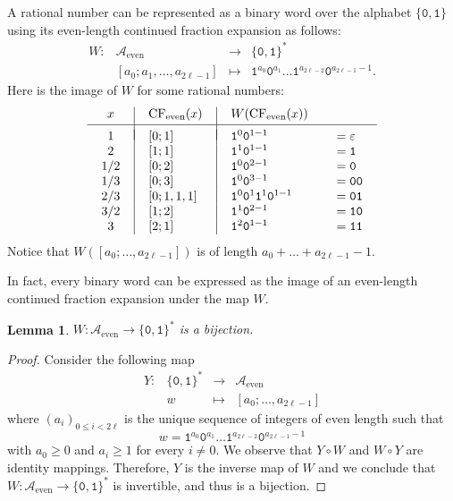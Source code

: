 \documentclass[a4paper,12pt]{amsart}
\newtheorem{lemma}[definition]{Lemma}
\newcommand{\xx}{{x}}
\newcommand{\Acal}{{\mathcal{A}}}
\newcommand{\0}{\mathtt{0}}
\newcommand{\1}{\mathtt{1}}
\newcommand{\2}{\mathtt{2}}
\newcommand{\3}{\mathtt{3}}
\newcommand{\Acaleven}{{\Acal_{\text{even}}}}
\DeclareMathOperator{\CFeven}{{CF_{\text{even}}}}
\begin{document}
A rational number can be represented as a binary word over the alphabet $\{\0,\1\}$
using its even-length continued fraction expansion as follows:
\[
\begin{array}{rccl}
W:&\Acaleven &\to&\{\0,\1\}^*\\
&[a_0;a_1,\dots,a_{2\ell-1}]
&\mapsto
&\1^{a_0}\0^{a_1}\dots \1^{a_{2\ell-2}}\0^{a_{2\ell-1}-1}.
\end{array}
\]
Here is the image of $W$ for some rational numbers:
\[
    \def\arraycolsep{4mm}
\begin{array}{c|l|ll}
    \xx      &  \CFeven(\xx) & W(\CFeven(\xx))\\[2pt]
    \hline
    &&&\\[-3mm]
    1               & [0;1]     & \1^0\0^{1-1}          &=\varepsilon   \\
    2               & [1;1]     & \1^1\0^{1-1}          &=\1            \\
    1/2             & [0;2]     & \1^0\0^{2-1}          &=\0\\
    1/3             & [0;3]     & \1^0\0^{3-1}          &=\0\0\\
    2/3             & [0;1,1,1] & \1^0\0^{1}\1^1\0^{1-1}&=\0\1\\
    3/2             & [1;2]     & \1^1\0^{2-1}          &=\1\0\\
    3               & [2;1]     & \1^2\0^{1-1}          &=\1\1
\end{array}
\]
Notice that $W([a_0;\dots,a_{2\ell-1}])$
is of length $a_0+\dots+a_{2\ell-1}-1$.

In fact, every binary word can be expressed as the image of an even-length
continued fraction expansion under the map $W$.
\begin{lemma}\label{lem:W-Acaleven-to-binarywords-bijection}
$W:\Acaleven\to\{\0,\1\}^*$ is a bijection.
\end{lemma}

\begin{proof}
    Consider the following map
\[
\begin{array}{rccl}
Y:&\{\0,\1\}^*&\to&\Acaleven\\
&w
&\mapsto
&[a_0;\dots,a_{2\ell-1}]
\end{array}
\]
    where $(a_i)_{0\leq i<2\ell}$ is the unique sequence of integers
    of even length
    such that
    \[
w= \1^{a_0}\0^{a_1}\dots \1^{a_{2\ell-2}}\0^{a_{2\ell-1}-1}
\]
with $a_0\geq 0$ and $a_i\geq1$ for every $i\neq0$.
We observe that $Y\circ W$ and $W\circ Y$ are identity mappings.
Therefore, $Y$ is the inverse map of $W$ and we conclude that
    $W:\Acaleven\to\{\0,\1\}^*$ is invertible,
and thus is a bijection.
\end{proof}
\end{document}
